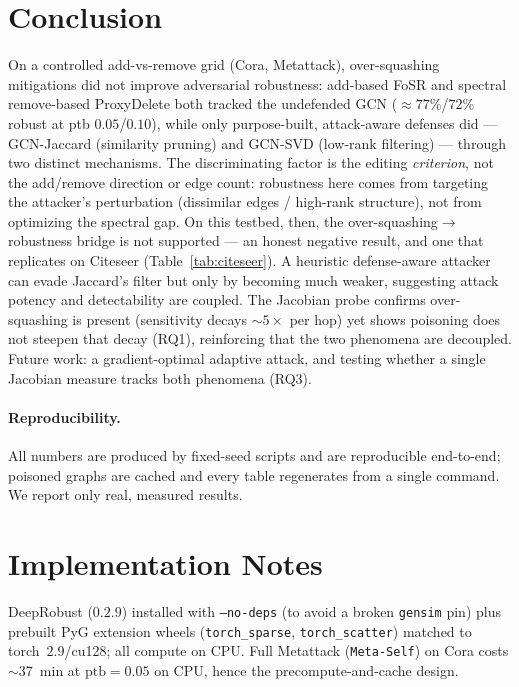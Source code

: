 \documentclass[10pt]{article}
\begin{document}
\section{Conclusion}
On a controlled add-vs-remove grid (Cora, Metattack), over-squashing mitigations did not improve
adversarial robustness: add-based FoSR and spectral remove-based ProxyDelete both tracked the undefended
GCN ($\approx$$77\%$/$72\%$ robust at ptb $0.05$/$0.10$), while only purpose-built, attack-aware defenses
did --- GCN-Jaccard (similarity pruning) and GCN-SVD (low-rank filtering) --- through two distinct
mechanisms. The discriminating factor is the editing \emph{criterion}, not the add/remove direction or
edge count: robustness here comes from targeting the attacker's perturbation (dissimilar edges / high-rank
structure), not from optimizing the spectral gap. On this testbed, then, the over-squashing$\to$robustness
bridge is not supported --- an honest negative result, and one that replicates on Citeseer
(Table~\ref{tab:citeseer}). A heuristic defense-aware attacker can evade Jaccard's filter but only by
becoming much weaker, suggesting attack potency and detectability are coupled. The Jacobian probe confirms
over-squashing is present (sensitivity decays $\sim$$5\times$ per hop) yet shows poisoning does not steepen
that decay (RQ1), reinforcing that the two phenomena are decoupled. Future work: a gradient-optimal
adaptive attack, and testing whether a single Jacobian measure tracks both phenomena (RQ3).

\paragraph{Reproducibility.} All numbers are produced by fixed-seed scripts and are reproducible end-to-end;
poisoned graphs are cached and every table regenerates from a single command. We report only real, measured
results.




\appendix
\section{Implementation Notes}
DeepRobust ($0.2.9$) installed with \texttt{--no-deps} (to avoid a broken \texttt{gensim} pin) plus prebuilt
PyG extension wheels (\texttt{torch\_sparse}, \texttt{torch\_scatter}) matched to torch~$2.9$/cu128; all
compute on CPU. Full Metattack (\texttt{Meta-Self}) on Cora costs $\sim$37~min at $\text{ptb}=0.05$ on CPU,
hence the precompute-and-cache design.
\end{document}
